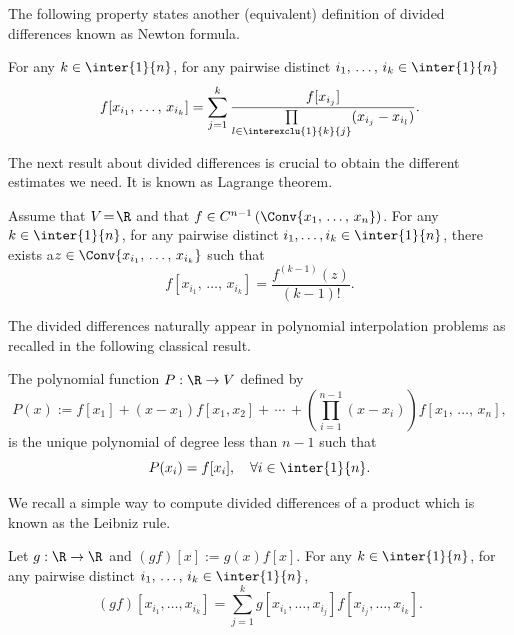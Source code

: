 The following property states another (equivalent) definition of divided differences known as Newton formula.

\begin{prop}\label{Prop:DifferencesDiviseesNewton}
For any $k \in \inter{1}{n}$, for any pairwise distinct $i_1,\,\dots,\,i_k \linebreak \in \inter{1}{n}$
\[
f[x_{i_1},\,\dots,\,x_{i_k}] = \sum_{j=1}^k \frac{f[x_{i_j}]}{\prod\limits_{l\in \interexclu{1}{k}{j}} (x_{i_j}- x_{i_l})}.
\]
\end{prop}

The next result about divided differences is crucial to obtain the different estimates we need. It is known as Lagrange theorem.

\begin{prop}\label{Prop:DifferencesDiviseesLagrange}
Assume that $V\!=\!\R$ and that $f \in C^{n-1} \left(\Conv \{ x_1,\,\dots,\,x_n \} \right)$. For any $k \in \inter{1}{n}$, for any pairwise distinct $i_1, \dots, i_k \in \inter{1}{n} $, there exists a\linebreak$z \in \Conv \{ x_{i_1},\,\dots,\,x_{i_k} \}$ such that
\[
f[x_{i_1},\,\dots,\,x_{i_k}] = \frac{f^{(k-1)}(z)}{(k-1)!}.
\]
\end{prop}


The divided differences naturally appear in polynomial interpolation problems as recalled in the following classical result.
\begin{prop}
The polynomial function $P:\R\to V$ defined by
\begin{equation}\label{lagrange_poly}
P(x) := f[x_1] + (x-x_1) f[x_1,x_2] +\,\dotsm \,+ \left(\prod_{i=1}^{n-1} (x-x_i) \right) f[x_1,\,\dotsc,\,x_n],
\end{equation}
is the unique polynomial of degree less than $n-1$ such that
\begin{equation}\label{interpolation_property}
P(x_i)=f[x_i], \quad \forall i\in \inter{1}{n}.
\end{equation}
\end{prop}

We recall a simple way to compute divided differences of a product which is known as the Leibniz rule.

\begin{prop}\label{Prop:DifferencesDiviseesLeibniz}
Let $g : \R \to \R$ and $(gf)[x] := g(x) f[x]$. For any $k \in \inter{1}{n}$, for any pairwise distinct $i_1,\,\dots,\,i_k \in \inter{1}{n}$,
\[
(gf)[x_{i_1}, \dots, x_{i_k}] = \sum_{j=1}^k g[x_{i_1}, \dots, x_{i_j}] f[x_{i_j}, \dots, x_{i_k}].
\]
\end{prop}

